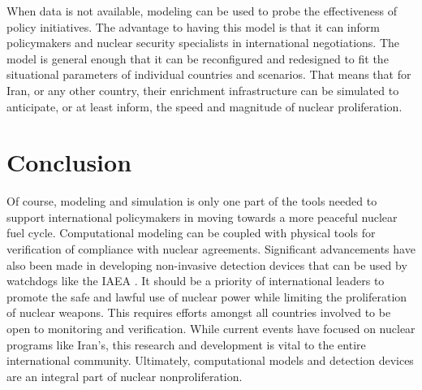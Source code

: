 \documentclass{article}
\begin{document}
When data is not available, modeling can be used to probe the effectiveness of policy initiatives. The advantage to having this model is that it can inform policymakers and nuclear security specialists in international negotiations. The model is general enough that it can be reconfigured and redesigned to fit the situational parameters of individual countries and scenarios. That means that for Iran, or any other country, their enrichment infrastructure can be simulated to anticipate, or at least inform, the speed and magnitude of nuclear proliferation.

\section{Conclusion}

Of course, modeling and simulation is only one part of the tools needed to support international policymakers in moving towards a more peaceful nuclear fuel cycle. Computational modeling can be coupled with physical tools for verification of compliance with nuclear agreements. Significant advancements have also been made in developing non-invasive detection devices that can be used by watchdogs like the IAEA \cite{origin}. It should be a priority of international leaders to promote the safe and lawful use of nuclear power while limiting the proliferation of nuclear weapons. This requires efforts amongst all countries involved to be open to monitoring and verification. While current events have focused on nuclear programs like Iran’s, this research and development is vital to the entire international community.  Ultimately, computational models and detection devices are an integral part of nuclear nonproliferation.

\pagebreak


\end{document}
